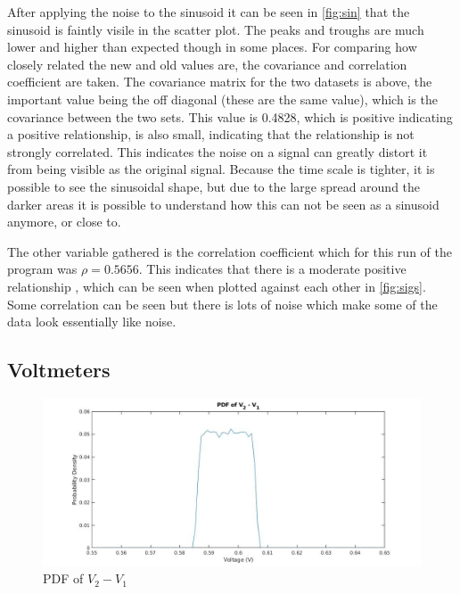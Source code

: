 \documentclass[a4paper, 12pt]{article}
\begin{document}
            After applying the noise to the sinusoid it can be seen in \cref{fig:sin} that the sinusoid is faintly visile in the scatter plot. The peaks and troughs are much lower and higher than expected though in some places. For comparing how closely related the new and old values are, the covariance and correlation coefficient are taken. The covariance matrix for the two datasets is above, the important value being the off diagonal (these are the same value), which is the covariance between the two sets. This value is 0.4828, which is positive indicating a positive relationship, is also small, indicating that the relationship is not strongly correlated. This indicates the noise on a signal can greatly distort it from being visible as the original signal. Because the time scale is tighter, it is possible to see the sinusoidal shape, but due to the large spread around the darker areas it is possible to understand how this can not be seen as a sinusoid anymore, or close to. 
            \par
            The other variable gathered is the correlation coefficient which for this run of the program was $\rho = 0.5656$. This indicates that there is a moderate positive relationship \cite{rumsey_2020}, which can be seen when plotted against each other in \cref{fig:sigs}. Some correlation can be seen but there is lots of noise which make some of the data look essentially like noise. 

        \subsection{Voltmeters}
            \begin{figure}[!t]
                \centering
                \includegraphics[width=\textwidth]{V3.jpg}
                \caption{PDF of $V_2 - V_1$}
                \label{fig:v3}
            \end{figure}
            
\end{document}
